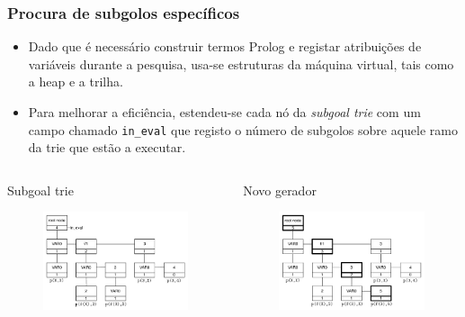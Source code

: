\documentclass{beamer}
\begin{document}
\begin{frame}
   \frametitle{Procura de subgolos específicos}
   \begin{itemize}
      \item Dado que é necessário construir termos Prolog e registar atribuições de variáveis durante a pesquisa,
      usa-se estruturas da máquina virtual, tais como a heap e a trilha.
      \pause
      \item Para melhorar a eficiência, estendeu-se cada nó da \emph{subgoal trie} com um campo chamado
      \texttt{in\_eval} que registo o número de subgolos sobre aquele ramo da trie que estão a executar.
   \end{itemize}
   \pause
   \begin{columns}[t]
        \begin{block}{Subgoal trie}
          \begin{figure}[ht]
            \centering
              \includegraphics[scale=0.33]{in_eval_trie.pdf}
          \end{figure}
        \pause
        \end{block}
         \begin{block}{Novo gerador}
           \begin{figure}[ht]
             \centering
               \includegraphics[scale=0.33]{in_eval_add.pdf}
           \end{figure}
         \end{block}


\end{columns}
\end{frame}
\end{document}
